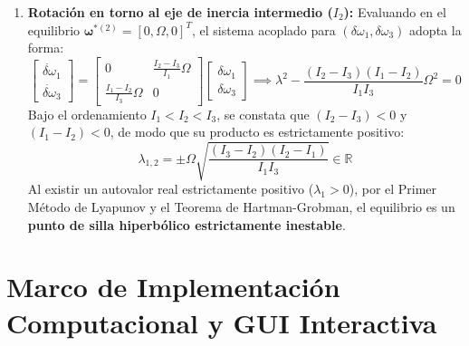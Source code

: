 \documentclass[11pt, a4paper]{article}
\begin{document}
\begin{enumerate}[leftmargin=*]
    \item \textbf{Rotación en torno al eje de inercia intermedio ($I_2$):}
    Evaluando en el equilibrio $\boldsymbol{\omega}^{*(2)} = [0, \Omega, 0]^T$, el sistema acoplado para $(\delta\omega_1, \delta\omega_3)$ adopta la forma:
    \begin{equation}
    \begin{bmatrix} \dot{\delta\omega}_1 \\ \dot{\delta\omega}_3 \end{bmatrix} = \begin{bmatrix} 0 & \frac{I_2 - I_3}{I_1}\Omega \\ \frac{I_1 - I_2}{I_3}\Omega & 0 \end{bmatrix} \begin{bmatrix} \delta\omega_1 \\ \delta\omega_3 \end{bmatrix} \implies \lambda^2 - \frac{(I_2 - I_3)(I_1 - I_2)}{I_1 I_3}\Omega^2 = 0
    \end{equation}
    Bajo el ordenamiento $I_1 < I_2 < I_3$, se constata que $(I_2 - I_3) < 0$ y $(I_1 - I_2) < 0$, de modo que su producto es estrictamente positivo:
    \begin{equation}
    \lambda_{1,2} = \pm \Omega \sqrt{\frac{(I_3 - I_2)(I_2 - I_1)}{I_1 I_3}} \in \mathbb{R}
    \end{equation}
    Al existir un autovalor real estrictamente positivo ($\lambda_1 > 0$), por el Primer Método de Lyapunov y el Teorema de Hartman-Grobman, el equilibrio es un \textbf{punto de silla hiperbólico estrictamente inestable}.
\end{enumerate}


\section{Marco de Implementación Computacional y GUI Interactiva}
\end{document}
